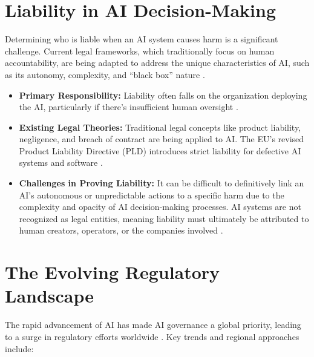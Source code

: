 \section{Liability in AI Decision-Making}
\label{sec:liability_in_ai}
Determining who is liable when an AI system causes harm is a significant challenge. Current legal frameworks, which traditionally focus on human accountability, are being adapted to address the unique characteristics of AI, such as its autonomy, complexity, and ``black box'' nature \parencite{ECLiabilityAI2022}.

\begin{itemize}
    \item \textbf{Primary Responsibility:} Liability often falls on the organization deploying the AI, particularly if there's insufficient human oversight \parencite{AaronHall2023}.
    \item \textbf{Existing Legal Theories:} Traditional legal concepts like product liability, negligence, and breach of contract are being applied to AI. The EU's revised Product Liability Directive (PLD) introduces strict liability for defective AI systems and software \parencite{GiskardAI2023}.
    \item \textbf{Challenges in Proving Liability:} It can be difficult to definitively link an AI's autonomous or unpredictable actions to a specific harm due to the complexity and opacity of AI decision-making processes. AI systems are not recognized as legal entities, meaning liability must ultimately be attributed to human creators, operators, or the companies involved \parencite{DailyJournal2023}.
\end{itemize}

\section{The Evolving Regulatory Landscape}
\label{sec:regulatory_landscape}
The rapid advancement of AI has made AI governance a global priority, leading to a surge in regulatory efforts worldwide \parencite{Informa2023}. Key trends and regional approaches include:


